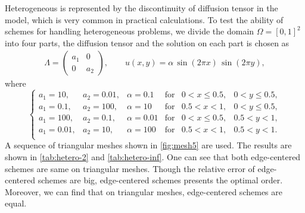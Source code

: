 \documentclass[times,review,preprint]{elsarticle}
\begin{document}
Heterogeneous is represented by the discontinuity of diffusion tensor  in the model, which is very common in practical calculations. To test the ability of schemes for handling heterogeneous problems, we divide the domain $\Omega = [0,1]^2$ into four parts, the diffusion tensor and the solution on each part is chosen as
\begin{align*}
\Lambda =
\left(
\begin{matrix}
a_1 & 0 \\
0 & a_2
\end{matrix}
\right),
\qquad
u(x,y) = \alpha \, \sin(2 \pi x) \, \sin(2 \pi y),
\end{align*}
where
\begin{equation*}
\left\{
\begin{array}{llllll}
a_1 = 10, & a_2 = 0.01, & \alpha = 0.1 & \text{for} & 0 < x \leq 0.5, & 0 < y \leq 0.5, \\
a_1 = 0.1, & a_2 = 100, & \alpha = 10 & \text{for} & 0.5 < x < 1, & 0 < y \leq 0.5, \\
a_1 = 100, & a_2 = 0.1, & \alpha = 0.01 & \text{for} & 0 < x \leq 0.5, & 0.5 < y < 1, \\
a_1 = 0.01, & a_2 = 10, & \alpha = 100 & \text{for} & 0.5 < x < 1, & 0.5 < y < 1. \\
\end{array}
\right.
\end{equation*}
A sequence of triangular meshes shown in \cref{fig:mesh5} are used. The results are shown in \cref{tab:hetero-2} and \cref{tab:hetero-inf}. One can see that both edge-centered schemes are same on triangular meshes. Though the relative error of edge-centered schemes are big, edge-centered schemes presents the optimal order. Moreover, we can find that on triangular meshes, edge-centered schemes are equal.
\end{document}
